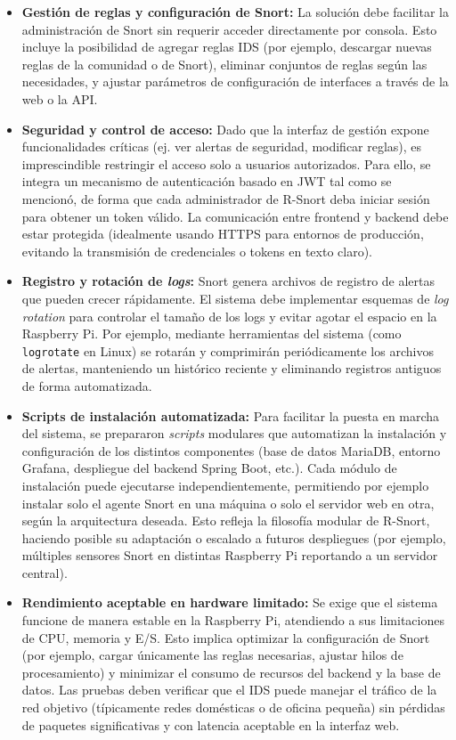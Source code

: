 \documentclass[11pt,a4paper,twoside]{report}
\begin{document}
\begin{itemize}
	\item \textbf{Gestión de reglas y configuración de Snort:} La solución debe facilitar la administración de Snort sin requerir acceder directamente por consola. Esto incluye la posibilidad de agregar reglas IDS (por ejemplo, descargar nuevas reglas de la comunidad o de Snort), eliminar conjuntos de reglas según las necesidades, y ajustar parámetros de configuración de interfaces a través de la web o la API.
	
	\item \textbf{Seguridad y control de acceso:} Dado que la interfaz de gestión expone funcionalidades críticas (ej. ver alertas de seguridad, modificar reglas), es imprescindible restringir el acceso solo a usuarios autorizados. Para ello, se integra un mecanismo de autenticación basado en JWT tal como se mencionó, de forma que cada administrador de R-Snort deba iniciar sesión para obtener un token válido. La comunicación entre frontend y backend debe estar protegida (idealmente usando HTTPS para entornos de producción, evitando la transmisión de credenciales o tokens en texto claro).
	
	\item \textbf{Registro y rotación de \emph{logs}:} Snort genera archivos de registro de alertas que pueden crecer rápidamente. El sistema debe implementar esquemas de \emph{log rotation} para controlar el tamaño de los logs y evitar agotar el espacio en la Raspberry Pi. Por ejemplo, mediante herramientas del sistema (como \texttt{logrotate} en Linux) se rotarán y comprimirán periódicamente los archivos de alertas, manteniendo un histórico reciente y eliminando registros antiguos de forma automatizada.
	
	\item \textbf{Scripts de instalación automatizada:} Para facilitar la puesta en marcha del sistema, se prepararon \emph{scripts} modulares que automatizan la instalación y configuración de los distintos componentes (base de datos MariaDB, entorno Grafana, despliegue del backend Spring Boot, etc.). Cada módulo de instalación puede ejecutarse independientemente, permitiendo por ejemplo instalar solo el agente Snort en una máquina o solo el servidor web en otra, según la arquitectura deseada. Esto refleja la filosofía modular de R-Snort, haciendo posible su adaptación o escalado a futuros despliegues (por ejemplo, múltiples sensores Snort en distintas Raspberry Pi reportando a un servidor central).
	
	\item \textbf{Rendimiento aceptable en hardware limitado:} Se exige que el sistema funcione de manera estable en la Raspberry Pi, atendiendo a sus limitaciones de CPU, memoria y E/S. Esto implica optimizar la configuración de Snort (por ejemplo, cargar únicamente las reglas necesarias, ajustar hilos de procesamiento) y minimizar el consumo de recursos del backend y la base de datos. Las pruebas deben verificar que el IDS puede manejar el tráfico de la red objetivo (típicamente redes domésticas o de oficina pequeña) sin pérdidas de paquetes significativas y con latencia aceptable en la interfaz web.
\end{itemize}
\end{document}
